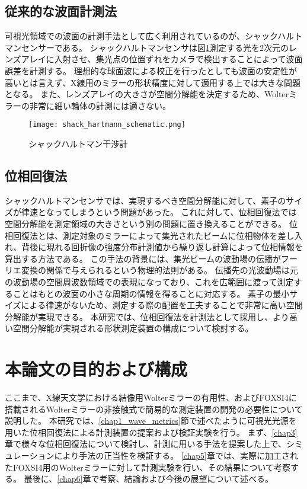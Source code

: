 \subsection{従来的な波面計測法}
\label{chap1_conventional_wave_metrics}
可視光領域での波面の計測手法として広く利用されているのが、シャックハルトマンセンサーである。
シャックハルトマンセンサは図\ref{fig:shack_hartmann_schematic}測定する光を2次元のレンズアレイに入射させ、集光点の位置ずれをカメラで検出することによって波面誤差を計測する。
理想的な球面波による校正を行ったとしても波面の安定性が高いとは言えず、X線用のミラーの形状精度に対して適用する上では大きな問題となる。
また、レンズアレイの大きさが空間分解能を決定するため、Wolterミラーの非常に細い輪体の計測には適さない。

\begin{figure}[h]
\centering
\texttt{[image: shack\_hartmann\_schematic.png]}
\caption{シャックハルトマン干渉計}
\label{fig:shack_hartmann_schematic}
\end{figure}

\subsection{位相回復法}
シャックハルトマンセンサでは、実現するべき空間分解能に対して、素子のサイズが律速となってしまうという問題があった。
これに対して、位相回復法では空間分解能を測定領域の大きさという別の問題に置き換えることができる。
位相回復法とは、測定対象のミラーによって集光されたビームに位相物体を差し入れ、背後に現れる回折像の強度分布計測値から繰り返し計算によって位相情報を算出する方法である。
この手法の背景には、集光ビームの波動場の伝播がフーリエ変換の関係で与えられるという物理的法則がある。
伝播先の光波動場は元の波動場の空間周波数領域での表現になっており、これを広範囲に渡って測定することはもとの波面の小さな周期の情報を得ることに対応する。
素子の最小サイズによる律速がないため、測定する際の配置を工夫することで非常に高い空間分解能が実現できる。
本研究では、位相回復法を計測法として採用し、より高い空間分解能が実現される形状測定装置の構成について検討する。

\clearpage
\newpage

\section{本論文の目的および構成}
\label{chap1_purpose}

ここまで、X線天文学における結像用Wolterミラーの有用性、およびFOXSI4に搭載されるWolterミラーの非接触式で簡易的な測定装置の開発の必要性について説明した。
本研究では、\ref{chap1_wave_metrics}節で述べたように可視光光源を用いた位相回復法による計測装置の提案および検証実験を行う。
まず、\ref{chap3}章で様々な位相回復法について検討し、計測に用いる手法を提案した上で、シミュレーションにより手法の正当性を検証する。
\ref{chap5}章では、実際に加工されたFOXSI4用のWolterミラーに対して計測実験を行い、その結果について考察する。
最後に、\ref{chap6}章で考察、結論および今後の展望について述べる。

